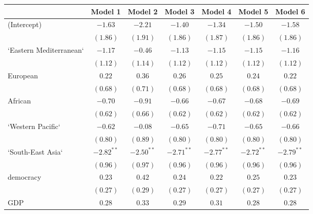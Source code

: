 
\begin{table}[!h]
\begin{center}
\begin{tabular}{l c c c c c c }
\toprule
 & Model 1 & Model 2 & Model 3 & Model 4 & Model 5 & Model 6 \\
\midrule
(Intercept)             & $-1.63$      & $-2.21$      & $-1.40$      & $-1.34$      & $-1.50$      & $-1.58$      \\
                        & $(1.86)$     & $(1.91)$     & $(1.86)$     & $(1.87)$     & $(1.86)$     & $(1.86)$     \\
`Eastern Mediterranean` & $-1.17$      & $-0.46$      & $-1.13$      & $-1.15$      & $-1.15$      & $-1.16$      \\
                        & $(1.12)$     & $(1.14)$     & $(1.12)$     & $(1.12)$     & $(1.12)$     & $(1.12)$     \\
European                & $0.22$       & $0.36$       & $0.26$       & $0.25$       & $0.24$       & $0.22$       \\
                        & $(0.68)$     & $(0.71)$     & $(0.68)$     & $(0.68)$     & $(0.68)$     & $(0.68)$     \\
African                 & $-0.70$      & $-0.91$      & $-0.66$      & $-0.67$      & $-0.68$      & $-0.69$      \\
                        & $(0.62)$     & $(0.66)$     & $(0.62)$     & $(0.62)$     & $(0.62)$     & $(0.62)$     \\
`Western Pacific`       & $-0.62$      & $-0.08$      & $-0.65$      & $-0.71$      & $-0.65$      & $-0.66$      \\
                        & $(0.80)$     & $(0.89)$     & $(0.80)$     & $(0.80)$     & $(0.80)$     & $(0.80)$     \\
`South-East Asia`       & $-2.82^{**}$ & $-2.50^{**}$ & $-2.71^{**}$ & $-2.77^{**}$ & $-2.72^{**}$ & $-2.79^{**}$ \\
                        & $(0.96)$     & $(0.97)$     & $(0.96)$     & $(0.96)$     & $(0.96)$     & $(0.96)$     \\
democracy               & $0.23$       & $0.42$       & $0.24$       & $0.22$       & $0.25$       & $0.23$       \\
                        & $(0.27)$     & $(0.29)$     & $(0.27)$     & $(0.27)$     & $(0.27)$     & $(0.27)$     \\
GDP                     & $0.28$       & $0.33$       & $0.29$       & $0.31$       & $0.28$       & $0.28$       \\

\end{tabular}
\end{center}
\end{table}

